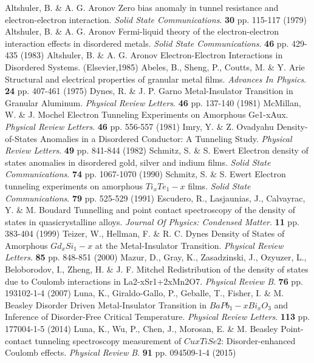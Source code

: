 
  \begin{thebibliography}{99}
Altshuler, B. \& A. G. Aronov Zero bias anomaly in tunnel resistance and electron-electron interaction. {\em Solid State Communications}. \textbf{30} pp. 115-117 (1979)
Altshuler, B. \& A. G. Aronov Fermi-liquid theory of the electron-electron interaction effects in disordered metals. {\em Solid State Communications}. \textbf{46} pp. 429-435 (1983)
Altshuler, B. \& A. G. Aronov Electron-Electron Interactions in Disordered Systems. (Elsevier,1985)
Abeles, B., Sheng, P., Coutts, M. \& Y. Arie Structural and electrical properties of granular metal films. {\em Advances In Physics}. \textbf{24} pp. 407-461 (1975)
Dynes, R. \& J. P. Garno Metal-Insulator Transition in Granular Aluminum. {\em Physical Review Letters}. \textbf{46} pp. 137-140 (1981)
McMillan, W. \& J. Mochel Electron Tunneling Experiments on Amorphous Ge1-xAux. {\em Physical Review Letters}. \textbf{46} pp. 556-557 (1981)
Imry, Y. \& Z. Ovadyahu Density-of-States Anomalies in a Disordered Conductor: A Tunneling Study. {\em Physical Review Letters}. \textbf{49} pp. 841-844 (1982)
Schmitz, S. \& S. Ewert Electron density of states anomalies in disordered gold, silver and indium films. {\em Solid State Communications}. \textbf{74} pp. 1067-1070 (1990)
Schmitz, S. \& S. Ewert Electron tunneling experiments on amorphous $Ti_xTe_1-x$ films. {\em Solid State Communications}. \textbf{79} pp. 525-529 (1991)
Escudero, R., Lasjaunias, J., Calvayrac, Y. \& M. Boudard Tunnelling and point contact spectroscopy of the density of states in quasicrystalline alloys. {\em Journal Of Physics: Condensed Matter}. \textbf{11} pp. 383-404 (1999)
Teizer, W., Hellman, F. \& R. C. Dynes Density of States of Amorphous $Gd_xSi_1-x$ at the Metal-Insulator Transition. {\em Physical Review Letters}. \textbf{85} pp. 848-851 (2000)
Mazur, D., Gray, K., Zasadzinski, J., Ozyuzer, L., Beloborodov, I., Zheng, H. \& J. F. Mitchel Redistribution of the density of states due to Coulomb interactions in La2-xSr1+2xMn2O7. {\em Physical Review B}. \textbf{76} pp. 193102-1-4 (2007)
Luna, K., Giraldo-Gallo, P., Geballe, T., Fisher, I. \& M. Beasley Disorder Driven Metal-Insulator Transition in $BaPb_1-xBi_xO_3$ and Inference of Disorder-Free Critical Temperature. {\em Physical Review Letters}. \textbf{113} pp. 177004-1-5 (2014)
Luna, K., Wu, P., Chen, J., Morosan, E. \& M. Beasley Point-contact tunneling spectroscopy measurement of $CuxTiSe2$: Disorder-enhanced Coulomb effects. {\em Physical Review B}. \textbf{91} pp. 094509-1-4 (2015)

\end{thebibliography}
